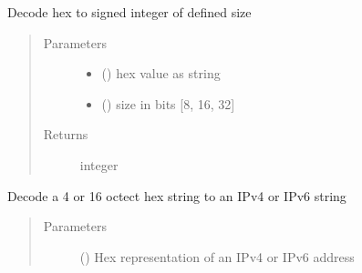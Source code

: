 \documentclass[letterpaper,10pt,english]{sphinxmanual}
\begin{document}
\begin{fulllineitems}
\begin{fulllineitems}
\begin{quote}
\begin{description}
\end{description}\end{quote}

\end{fulllineitems}


\begin{fulllineitems}
\label{\detokenize{dhcp_decode-class:bloxone.dhcp_decode.hex_to_int}}
\sphinxAtStartPar
Decode hex to signed integer of defined size
\begin{quote}\begin{description}
\item[{Parameters}] \leavevmode\begin{itemize}
\item {} 
\sphinxAtStartPar
{} () \textendash{} hex value as string

\item {} 
\sphinxAtStartPar
{} () \textendash{} size in bits {[}8, 16, 32{]}

\end{itemize}

\item[{Returns}] \leavevmode
\sphinxAtStartPar
integer

\end{description}\end{quote}

\end{fulllineitems}


\begin{fulllineitems}
\label{\detokenize{dhcp_decode-class:bloxone.dhcp_decode.hex_to_ip}}
\sphinxAtStartPar
Decode a 4 or 16 octect hex string to an IPv4 or IPv6 string
\begin{quote}\begin{description}
\item[{Parameters}] \leavevmode
\sphinxAtStartPar
{} () \textendash{} Hex representation of an IPv4 or IPv6 address


\end{description}
\end{quote}
\end{fulllineitems}
\end{fulllineitems}
\end{document}
